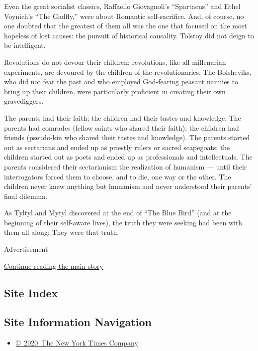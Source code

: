 Even the great socialist classics, Raffaello Giovagnoli's ``Spartacus''
and Ethel Voynich's ``The Gadfly,'' were about Romantic self-sacrifice.
And, of course, no one doubted that the greatest of them all was the one
that focused on the most hopeless of lost causes: the pursuit of
historical causality. Tolstoy did not deign to be intelligent.

Revolutions do not devour their children; revolutions, like all
millenarian experiments, are devoured by the children of the
revolutionaries. The Bolsheviks, who did not fear the past and who
employed God-fearing peasant nannies to bring up their children, were
particularly proficient in creating their own gravediggers.

The parents had their faith; the children had their tastes and
knowledge. The parents had comrades (fellow saints who shared their
faith); the children had friends (pseudo-kin who shared their tastes and
knowledge). The parents started out as sectarians and ended up as
priestly rulers or sacred scapegoats; the children started out as poets
and ended up as professionals and intellectuals. The parents considered
their sectarianism the realization of humanism --- until their
interrogators forced them to choose, and to die, one way or the other.
The children never knew anything but humanism and never understood their
parents' final dilemma.

As Tyltyl and Mytyl discovered at the end of ``The Blue Bird'' (and at
the beginning of their self-aware lives), the truth they were seeking
had been with them all along: They were that truth.

Advertisement

\protect\hyperlink{after-bottom}{Continue reading the main story}

\hypertarget{site-index}{%
\subsection{Site Index}\label{site-index}}

\hypertarget{site-information-navigation}{%
\subsection{Site Information
Navigation}\label{site-information-navigation}}

\begin{itemize}
\tightlist
\item
  \href{https://help.nytimes.com/hc/en-us/articles/115014792127-Copyright-notice}{©~2020~The
  New York Times Company}
\end{itemize}

